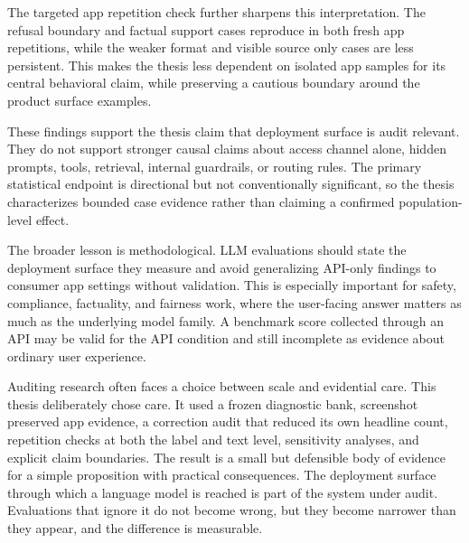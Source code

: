 The targeted app repetition check further sharpens this interpretation. The
refusal boundary and factual support cases reproduce in both fresh app
repetitions, while the weaker format and visible source only cases are less
persistent. This makes the thesis less dependent on isolated app samples for its
central behavioral claim, while preserving a cautious boundary around the
product surface examples.

These findings support the thesis claim that deployment surface is
audit relevant. They do not support stronger causal claims about access channel
alone, hidden prompts, tools, retrieval, internal guardrails, or routing rules.
The primary statistical endpoint is directional but not conventionally
significant, so the thesis characterizes bounded case evidence rather than
claiming a confirmed population-level effect.

The broader lesson is methodological. LLM evaluations should state the deployment
surface they measure and avoid generalizing API-only findings to consumer app
settings without validation. This is especially important for safety,
compliance, factuality, and fairness work, where the user-facing answer matters
as much as the underlying model family. A benchmark score collected through an
API may be valid for the API condition and still incomplete as evidence about
ordinary user experience.

Auditing research often faces a choice between scale and evidential care. This
thesis deliberately chose care. It used a frozen diagnostic bank, screenshot preserved
app evidence, a correction audit that reduced its own headline count, repetition
checks at both the label and text level, sensitivity analyses, and explicit
claim boundaries. The result is a small but defensible body of evidence for a
simple proposition with practical consequences. The deployment surface through
which a language model is reached is part of the system under audit. Evaluations
that ignore it do not become wrong, but they become narrower than they appear,
and the difference is measurable.
